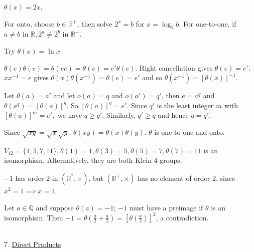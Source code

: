 \documentclass[12pt]{book}
\theoremstyle{definition}
\begin{document}
\begin{oddenumerate}
	\item $\theta(x)=2x.$ 
	
	\item For onto, choose $ b\in \mathbb{R}^+ $, then solve $ 2^x=b  $ for $ x=\log_2b $. For one-to-one, if $ a\neq b \text{ in } \mathbb{R},  2^a \neq 2^b$ in $ \mathbb{R}^+. $
	
	\item Try $ \theta(x)=\ln x $.
	
	\item $ \theta(e)\theta(e)=\theta(ee)=\theta(e)=e'\theta(e). $ Right cancellation gives $ \theta(e)=e'. $ $ xx^{-1}=e $ gives $ \theta(x)\theta(x^{-1})=\theta(e)=e' $ and so $ \theta(x^{-1})=[\theta(x)]^{-1} $.
	
	\item Let $ \theta(a)=a' $ and let $ o(a)=q $ and $ o(a')=q' $, then $ e=a^q $ and $ \theta(a^q)=[\theta(a)]^{q} $. So $ [\theta(a)]^q=e'. $ Since $ q' $ is the least integer $ m $ with $ [\theta (a)]^m=e', $ we have $ q \geq q' $. Similarly, $ q'\geq q $ and hence $ q=q'. $
	
	\item Since $ \sqrt{xy}=\sqrt{x}\sqrt{y} $, $ \theta(xy)=\theta(x)\theta(y). $ $ \theta $ is one-to-one and onto. 
	
	\item $ V_{12}=\{1,5,7,11\}.~ \theta(1)=1, \theta(3)=5, \theta(5)=7, \theta(7)=11 $ is an isomorphism. Alternatively, they are both Klein 4-groups. 
	
	\item $ -1 $ has order $ 2 $ in $ (\mathbb{R}^*,\times) $, but $ (\mathbb{R}^+,\times) $ has no element of order $ 2 $, since $ x^2=1 \implies x=1 $.
	
	\item Let $ a\in \mathbb{Q} $ and suppose $\theta(a)=-1$; $-1$ must have a preimage if $\theta$ is an isomorphism. Then $-1=\theta (\frac{a}{2}+\frac{a}{2}) = [\theta(\frac{a}{2})]^2$, a contradiction. 
	
	
\end{oddenumerate}


~\\[.1in]
{\Large 7. \underline{Direct Products}}
\end{document}
